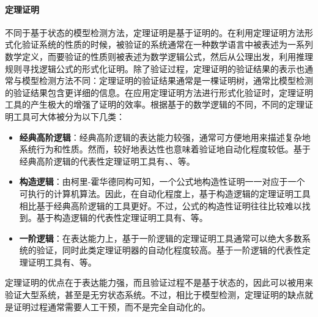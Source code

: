 \paragraph{定理证明}
不同于基于状态的模型检测方法，定理证明\cite{Fitting96,Loveland78,Burel09}是基于证明的。在利用定理证明方法形式化验证系统的性质的时候，被验证的系统通常在一种数学语言中被表述为一系列数学定义，而要验证的性质则被表述为数学逻辑公式，然后从公理出发，利用推理规则寻找逻辑公式的形式化证明。除了验证过程，定理证明的验证结果的表示也通常与模型检测方法不同：定理证明的验证结果通常是一棵证明树，通常比模型检测的验证结果包含更详细的信息。在应用定理证明方法进行形式化验证时，定理证明工具的产生极大的增强了证明的效率。根据基于的数学逻辑的不同，不同的定理证明工具可大体被分为以下几类：
\begin{itemize}

	\item \textbf{经典高阶逻辑}：经典高阶逻辑的表达能力较强，通常可方便地用来描述复杂地系统行为和性质。然而，较好地表达性也意味着验证地自动化程度较低。基于经典高阶逻辑的代表性定理证明工具有\cite{Gordon00}、\cite{Nipkow12}、\cite{OwreRS92}等。
	\item \textbf{构造逻辑}：由柯里-霍华德同构可知，一个公式地构造性证明一一对应于一个可执行的计算机算法。因此，在自动化程度上，基于构造逻辑的定理证明工具相比基于经典高阶逻辑的工具更好。不过，公式的构造性证明往往比较难以找到。基于构造逻辑的代表性定理证明工具有\cite{BertotC04}、\cite{AllenCEKL00}等。
	\item \textbf{一阶逻辑}：在表达能力上，基于一阶逻辑的定理证明工具通常可以绝大多数系统的验证，同时此类定理证明器的自动化程度较高。基于一阶逻辑的代表性定理证明工具有\cite{KaufmannM08}、\cite{cs-LO-9301106}等。
\end{itemize}
定理证明的优点在于表达能力强，而且验证过程不是基于状态的，因此可以被用来验证大型系统，甚至是无穷状态系统。不过，相比于模型检测，定理证明的缺点就是证明过程通常需要人工干预，而不是完全自动化的。

